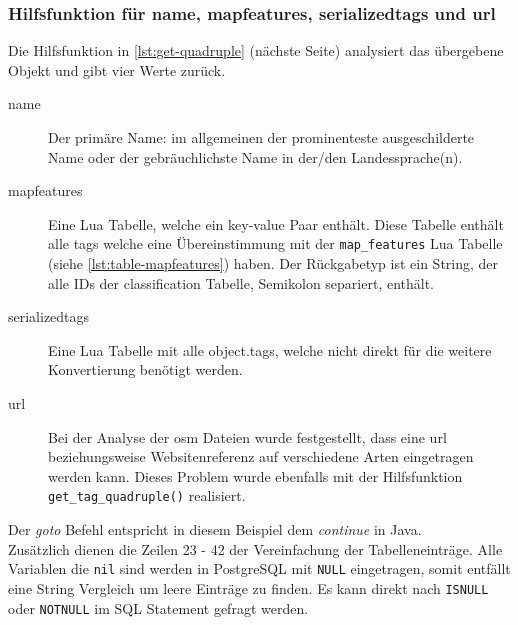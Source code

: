 \subsubsection{Hilfsfunktion für name, mapfeatures, serializedtags und url}\label{subsubsec:get.quadruple}
Die Hilfsfunktion in \autoref{lst:get-quadruple} (nächste Seite) analysiert das übergebene Objekt und gibt vier Werte zurück.
\begin{description}
	\item[name] Der primäre Name: im allgemeinen der prominenteste ausgeschilderte Name oder der gebräuchlichste Name in der/den Landessprache(n). 
	\item[mapfeatures] Eine Lua Tabelle, welche ein key-value Paar enthält. Diese Tabelle enthält alle tags welche eine Übereinstimmung mit der \lstinline|map_features| Lua Tabelle (siehe \autoref{lst:table-mapfeatures}) haben. Der Rückgabetyp ist ein String, der alle IDs der classification Tabelle, Semikolon separiert, enthält.
	\item[serializedtags] Eine Lua Tabelle mit alle object.tags, welche nicht direkt für die weitere Konvertierung benötigt werden.
	\item[url] Bei der Analyse der osm Dateien wurde festgestellt, dass eine url beziehungsweise Websitenreferenz auf verschiedene Arten eingetragen werden kann. Dieses Problem wurde ebenfalls mit der Hilfsfunktion \lstinline| get_tag_quadruple()| realisiert.
\end{description}
Der \textit{goto} Befehl entspricht in diesem Beispiel dem \textit{continue} in Java.\\
Zusätzlich dienen die Zeilen 23 - 42 der Vereinfachung der Tabelleneinträge. Alle Variablen die \lstinline|nil| sind werden in PostgreSQL mit \lstinline|NULL| eingetragen, somit entfällt eine String Vergleich um leere Einträge zu finden. Es kann direkt nach \lstinline|ISNULL| oder \lstinline|NOTNULL| im SQL Statement gefragt werden.

